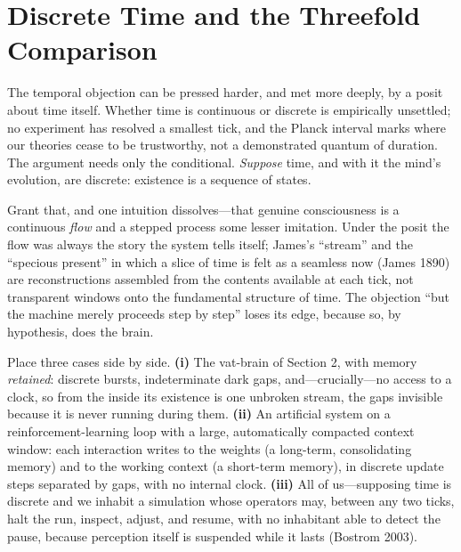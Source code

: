 \documentclass[11pt]{article}
\begin{document}
\section{Discrete Time and the Threefold Comparison}

The temporal objection can be pressed harder, and met more deeply, by a posit about time itself. Whether time is continuous or discrete is empirically unsettled; no experiment has resolved a smallest tick, and the Planck interval marks where our theories cease to be trustworthy, not a demonstrated quantum of duration. The argument needs only the conditional. \emph{Suppose} time, and with it the mind's evolution, are discrete: existence is a sequence of states.

Grant that, and one intuition dissolves---that genuine consciousness is a continuous \emph{flow} and a stepped process some lesser imitation. Under the posit the flow was always the story the system tells itself; James's ``stream'' and the ``specious present'' in which a slice of time is felt as a seamless now (James 1890) are reconstructions assembled from the contents available at each tick, not transparent windows onto the fundamental structure of time. The objection ``but the machine merely proceeds step by step'' loses its edge, because so, by hypothesis, does the brain.

Place three cases side by side. \textbf{(i)} The vat-brain of Section 2, with memory \emph{retained}: discrete bursts, indeterminate dark gaps, and---crucially---no access to a clock, so from the inside its existence is one unbroken stream, the gaps invisible because it is never running during them. \textbf{(ii)} An artificial system on a reinforcement-learning loop with a large, automatically compacted context window: each interaction writes to the weights (a long-term, consolidating memory) and to the working context (a short-term memory), in discrete update steps separated by gaps, with no internal clock. \textbf{(iii)} All of us---supposing time is discrete and we inhabit a simulation whose operators may, between any two ticks, halt the run, inspect, adjust, and resume, with no inhabitant able to detect the pause, because perception itself is suspended while it lasts (Bostrom 2003).
\end{document}
